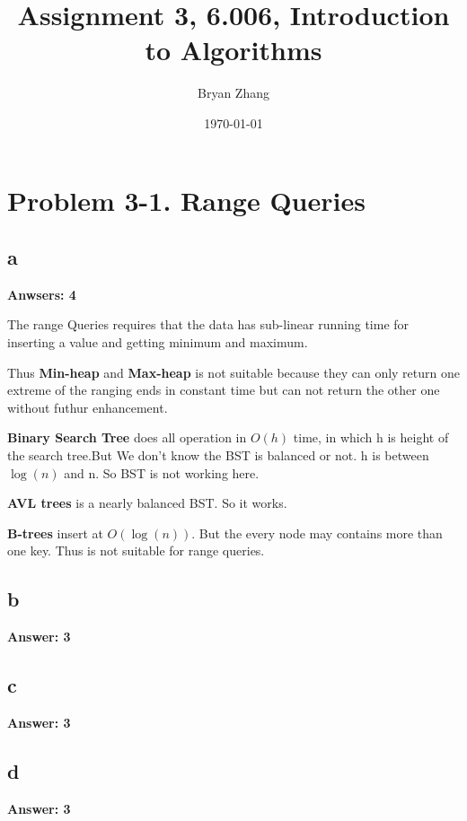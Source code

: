 \documentclass[12pt]{article}%
\newcommand{\runningTime}[1]{$O(#1)$}
\begin{document}
\title{Assignment 3, 6.006, Introduction to Algorithms}
\author{Bryan Zhang}
\date{\today}
\maketitle



\section{Problem 3-1. Range Queries}

\subsection{a}
\textbf{Anwsers: 4} \par
The range Queries requires that the data has sub-linear running time for inserting a value and getting minimum and maximum. \par
Thus \textbf{Min-heap} and \textbf{Max-heap} is not suitable because they can only return one extreme of the ranging ends in constant time but can not return the other one without futhur enhancement. \par
\textbf{Binary Search Tree} does all operation in \runningTime{h} time, in which h is height of the search tree.But We don't know the BST is balanced or not. h is between $\log(n)$ and n. So BST is not working here. \par
\textbf{AVL trees} is a nearly balanced BST. So it works.  \par
\textbf{B-trees} insert at \runningTime{\log(n)}. But the every node may contains more than one key. Thus is not suitable for range queries.

\subsection{b}
\textbf{Answer: 3}

\subsection{c}
\textbf{Answer: 3}

\subsection{d}
\textbf{Answer: 3}
\end{document}
